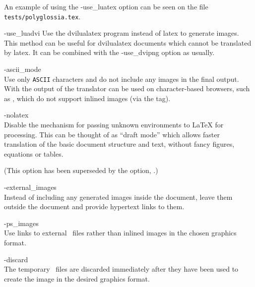 \begin{htmllist}
An example of using the -use\_luatex option can be seen
on the file \texttt{tests/polyglossia.tex}.

%
\item [ -use\_luadvi \label{cs_use_luadvi}]
Use the dvilualatex program instead of latex to generate images.
This method can be useful for dvilualatex documents which cannot
be translated by latex.
It can be combined with the -use\_dvipng option as usually.

% 
%
\item [ -ascii\_mode \label{cs_asciimode}]
\\
Use only \texttt{ASCII} characters and do not include any images in the final output.
With  the output of the translator can be used on 
character-based browsers, such as ,
which do not support inlined images (via the  tag).


%
\item [ -nolatex \label{cs_nolatex}]
\\
Disable the mechanism for passing unknown environments to \LaTeX{} for processing.
This can be thought of as ``draft mode'' which allows 
faster translation of the basic document structure and text, 
without fancy figures, equations or tables. 

(This option has been superseded by the  option,
.)


%
\item [ -external\_images\label{cs_extimages}]
\\
Instead of including any generated images inside the document, 
leave them outside the document and provide hypertext links to them.


%
\item [ -ps\_images\label{cs_psimages}]
\\
Use links to external \PS\ files rather than inlined images
in the chosen graphics format.

%
\item [ -discard\label{cs_discard}]
\\
The temporary \PS\ files are discarded immediately after they
have been used to create the image in the desired graphics format.


\end{htmllist}

